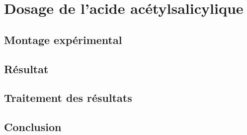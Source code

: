 \documentclass[12pt]{article}
\begin{document}
\section{Dosage de l'acide acétylsalicylique}
	\subsection{Montage expérimental}
	
	\subsection{Résultat}

	\subsection{Traitement des résultats}
	
	\subsection{Conclusion}
\end{document}
